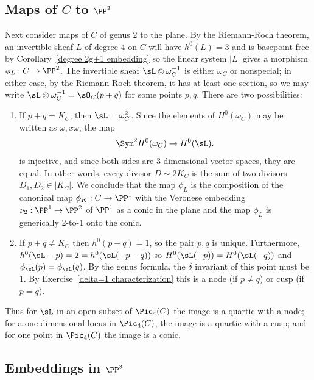 \subsection{Maps of $C$ to $\PP^2$} 
Next consider maps of $C$ of genus 2 to the plane. By the Riemann-Roch theorem, an invertible sheaf $L$ of degree 4 on $C$ will have $h^0(L) = 3$ and is basepoint free by Corollary~\ref{degree 2g+1 embedding} so the linear system $|L|$  gives a morphism $\phi_L : C \to \PP^2$. The invertible sheaf $\sL\otimes \omega_C^{-1}$ is either
$\omega_C$ or nonspecial; in either case, by the Riemann-Roch theorem, it has at least one section, 
so we may write $\sL\otimes \omega_C^{-1} = \sO_C(p+q)$ for some points $p,q$. There are two possibilities:

\begin{enumerate}
\item If $p+q =  K_C$, then $\sL = \omega_C^2$. Since
the elements of $H^0(\omega_C)$ may be written as $\omega, x\omega$, the map
$$
\Sym^2 H^0(\omega_C) \to H^0(\sL).
$$
 is injective, and since both sides are 3-dimensional vector spaces, they are equal. In other words, every divisor $D \sim 2K_C$ is the sum of two divisors $D_1, D_2 \in |K_C|$. We conclude that the map $\phi_L$ is the composition of the canonical map $\phi_K : C \to \PP^1$ with the Veronese embedding $\nu_2 : \PP^1 \to \PP^2$ of $\PP^1$ as a conic in the plane and the map $\phi_L$ is generically 2-to-1 onto the conic.

\item \label{p+q not g12} If $p+q \neq  K_C$  then $h^0(p+q) = 1$, so the pair $p,q$ is unique. Furthermore,
 $h^0(\sL-p) = 2 =  h^0(\sL(-p-q))$ so 
 $H^0(\sL(-p)) = H^0(\sL(-q))$ and $\phi_\sL(p) = \phi_\sL(q)$. 
By the genus formula, the $\delta$ invariant of this point must be 1. By Exercise~\ref{delta=1 characterization}
 this is a node (if $p\neq q$) or cusp (if $p=q$).

\end{enumerate}

Thus  for $\sL$ in an open subset of $\Pic_4(C)$ the image is a quartic with a node; for a one-dimensional locus in $\Pic_4(C)$, the image is a quartic with a cusp; and for one point in $\Pic_4(C)$ the image is a conic.

\subsection{Embeddings in $\PP^3$}

